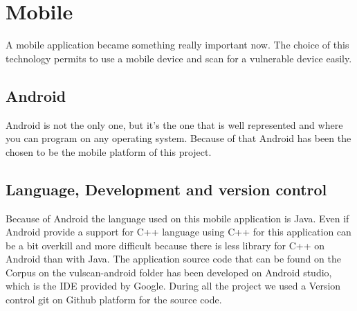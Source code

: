 \documentclass{report}
\begin{document}
\section{Mobile}
A mobile application became something really important now. The choice of this technology permits to use a mobile device and scan for a vulnerable device easily.

\subsection{Android}
Android is not the only one, but it's the one that is well represented and where you can program on any operating system. Because of that Android has been the chosen to be the mobile platform of this project.

\subsection{Language, Development and version control}
Because of Android the language used on this mobile application is Java. Even if Android provide a support for C++ language using C++ for this application can be a bit overkill and more difficult because there is less library for C++ on Android than with Java.\newline
The application source code that can be found on the Corpus on the vulscan-android folder has been developed on Android studio, which is the IDE provided by Google.\newline
During all the project we used a Version control git on Github platform for the source code.
\end{document}
